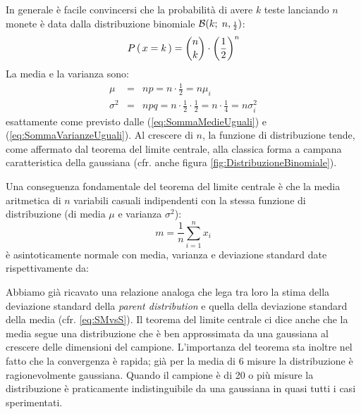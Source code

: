 \begin{exemplify}
{In generale \`e facile convincersi che la probabilit\`a di avere $k$ teste
lanciando $n$ monete \`e data dalla distribuzione binomiale
${\cal B}(k; \; n, {\scriptscriptstyle \frac{1}{2}})$:
$$
\displaystyle P\left(\, x = k \, \right) = \binom{n}{k}\cdot \left( \frac{1}{2} \right)^n
$$
La media e la varianza sono:
\begin{eqnarray*}
\mu &=& n p = n\cdot \frac{1}{2} = n\mu_i\\
\sigma^2 &=& n p q = n\cdot \frac{1}{2}
\cdot \frac{1}{2} = n\cdot \frac{1}{4} = n\sigma^2_i
\end{eqnarray*}
esattamente come previsto dalle (\ref{eq:SommaMedieUguali}) e
(\ref{eq:SommaVarianzeUguali}).
Al crescere di $n$, la funzione di distribuzione tende, come affermato dal
teorema del limite centrale, alla classica forma a campana caratteristica
della gaussiana (cfr. anche figura \ref{fig:DistribuzioneBinomiale}).}

\end{exemplify}

Una conseguenza fondamentale del teorema del limite centrale \`e che la
media aritmetica di $n$ variabili casuali indipendenti con la stessa
funzione di distribuzione (di media $\mu$ e varianza $\sigma^2$):
$$
m = \frac{1}{n}\sum_{i=1}^{n} x_i
$$
\`e asintoticamente normale con media, varianza e deviazione standard
date rispettivamente da:

Abbiamo gi\`a ricavato una relazione analoga che lega tra loro la stima della
deviazione standard della {\itshape parent distribution} e quella della
deviazione standard della media (cfr. \ref{eq:SMvsS}).
Il teorema del limite centrale ci dice anche che la media segue una
distribuzione che \`e ben approssimata da una gaussiana al crescere delle
dimensioni del campione.
L'importanza del teorema sta inoltre nel fatto che la convergenza \`e rapida;
gi\`a per la media di 6 misure la distribuzione \`e ragionevolmente gaussiana.
Quando il campione \`e di 20 o pi\`u misure la distribuzione \`e praticamente
indistinguibile da una gaussiana in quasi tutti i casi sperimentati.

